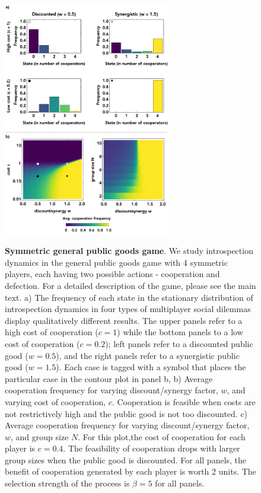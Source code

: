 \documentclass[11pt]{article}
\theoremstyle{plainCl1}
\theoremstyle{plainCl2}
\begin{document}
\clearpage
\begin{figure}
\centering
\includegraphics[width =  0.65\textwidth, keepaspectratio]{figures/figure3}~\\[0.4cm]
\caption{\onehalfspacing
\textbf{Symmetric general public goods game}. We study introspection dynamics in the general public goods game with 4 symmetric players, each having two possible actions - cooperation and defection. For a detailed description of the game, please see the main text. a) The frequency of each state in the stationary distribution of introspection dynamics in four types of multiplayer social dilemmas display qualitatively different results. The upper panels refer to a high cost of cooperation ($c=1$) while the bottom panels to a low cost of cooperation ($c = 0.2$); left panels refer to a discounted public good ($w = 0.5$), and the right panels refer to a synergistic public good ($w = 1.5$). Each case is tagged with a symbol that places the particular case in the contour plot in panel b, b) Average cooperation frequency for varying discount/synergy factor, $w$, and varying cost of cooperation, $c$. Cooperation is feasible when costs are not restrictively high and the public good is not too discounted. c) Average cooperation frequency for varying discount/synergy factor, $w$, and group size $N$. For this plot,the cost of cooperation for each player is $c = 0.4$. The feasibility of cooperation drops with larger group sizes when the public good is discounted. For all panels, the benefit of cooperation generated by each player is worth 2 units. The selection strength of the process is $\beta = 5$ for all panels.} 
\label{Fig:GPGG-symmetric}
\end{figure}
\end{document}
